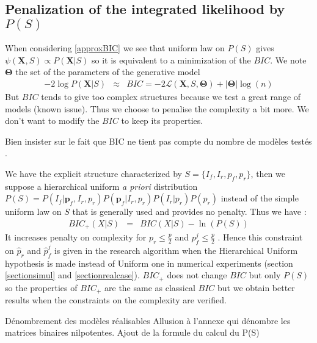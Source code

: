\documentclass[12pt,a4paper]{report}
\begin{document}
		\subsection{Penalization of the integrated likelihood by $P(S)$} \label{compstruct}
When considering \ref{approxBIC} we see that uniform law on $P(S)$ gives $\psi(\boldsymbol{X},S)\propto P(\boldsymbol{X}|S)$ so it is equivalent to a minimization of the $BIC$.
	We note $\boldsymbol{\Theta}$ the set of the parameters of the generative model
	\begin{eqnarray}
		-2\log P(\boldsymbol{X}|S)&\approx & BIC=-2\mathcal{L}(\boldsymbol{X},S,\boldsymbol{\Theta})+|\boldsymbol{\Theta}|\log(n)  
	\end{eqnarray}
	But $BIC$ tends to give too complex structures because we test a great range of models (known issue). Thus we choose to penalise the complexity a bit more. We don't want to modify the $BIC$ to keep its properties.
	

Bien insister sur le fait que BIC ne tient pas compte du nombre de modèles testés \cite{massart2007concentration}. 


We have the explicit structure characterized by $S=\{I_f,I_r,p_f,p_r\}$, then we suppose a hierarchical uniform {\it a priori} distribution $P(S)=P(I_f | \boldsymbol{p}_f,I_r,p_r)P(\boldsymbol{p}_f|I_r,p_r)P(I_r|p_r)P(p_r)$  instead of the simple uniform law on $S$ that is generally used and provides no penalty.
	 Thus we have :
		\begin{eqnarray}
		BIC_+(X|S)&=&BIC(X|S) -\ln(P(S)) \label{Bicstar}
	\end{eqnarray}		
	It increases penalty on complexity for $p_r\leq\frac{p}{2}$ and $p_f^j\leq\frac{p}{2}$ . Hence %
	this constraint on $\hat{p}_r$ and $\hat{p}_f^j$ is given in the research algorithm when the Hierarchical Uniform hypothesis is made instead of Uniform one in numerical experiments (section \ref{sectionsimul} and \ref{sectionrealcase}).
		$BIC_+$ does not change $BIC$ but only $P(S)$ so the properties of $BIC_+$ are the same as classical $BIC$ but we obtain better results when the constraints on the complexity are verified.  %

Dénombrement des modèles réalisables
Allusion à l'annexe qui dénombre les matrices binaires nilpotentes.
Ajout de la formule du calcul du P(S) 
%	 
%	
\end{document}
